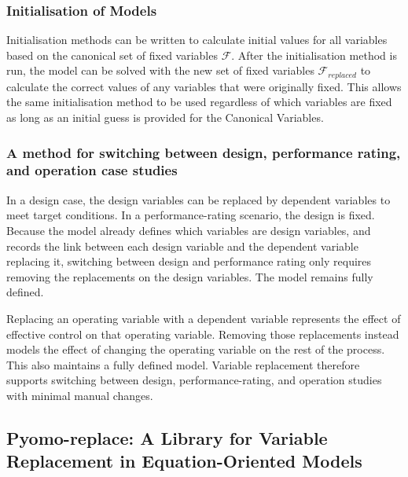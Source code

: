 \hypertarget{initialisation-of-repeated-replacement}{%
\subsubsection{Initialisation of Models}\label{initialisation-of-repeated-replacement}}

Initialisation methods can be written to calculate initial values for
all variables based on the canonical set of fixed variables
\(\mathcal{F}\). After the initialisation method is run, the model can
be solved with the new set of fixed variables \(\mathcal{F}_{replaced}\)
to calculate the correct values of any variables that were originally
fixed. This allows the same initialisation method to be used regardless
of which variables are fixed as long as an initial guess is provided for
the Canonical Variables.

\hypertarget{design-and-operation-variables}{
\subsubsection{A method for switching between design, performance rating, and operation case studies}\label{design-and-operation-variables}}

In a design case, the design variables can be replaced by dependent
variables to meet target conditions. In a performance-rating scenario,
the design is fixed. Because the model already defines which variables
are design variables, and records the link between each design variable
and the dependent variable replacing it, switching between design and
performance rating only requires removing the replacements on the design
variables. The model remains fully defined.

Replacing an operating variable with a dependent variable represents the
effect of effective control on that operating variable. Removing those
replacements instead models the effect of changing the operating
variable on the rest of the process. This also maintains a fully defined
model. Variable replacement therefore supports switching between design,
performance-rating, and operation studies with minimal manual changes.


\hypertarget{introduction-to-pyomo-replace}{%
\subsection{
Pyomo-replace: A Library for Variable Replacement in Equation-Oriented Models}\label{introduction-to-pyomo-replace}}

